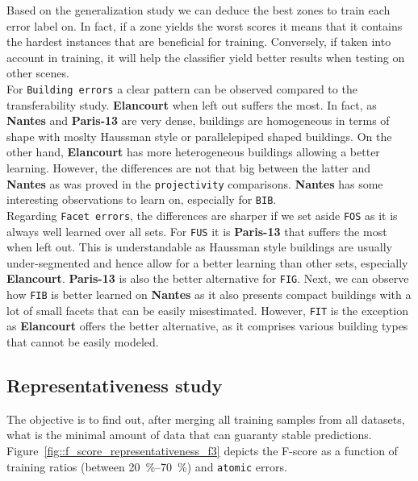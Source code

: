         Based on the generalization study we can deduce the best zones to train each error label on.
        In fact, if a zone yields the worst scores it means that it contains the hardest instances that are beneficial for training.
        Conversely, if taken into account in training, it will help the classifier yield better results when testing on other scenes.\\

        For \texttt{Building errors} a clear pattern can be observed compared to the transferability study.
        \textbf{Elancourt} when left out suffers the most.
        In fact, as \textbf{Nantes} and \textbf{Paris-13} are very dense, buildings are homogeneous in terms of shape with moslty Haussman style or parallelepiped shaped buildings.
        On the other hand, \textbf{Elancourt} has more heterogeneous buildings allowing a better learning.
        However, the differences are not that big between the latter and \textbf{Nantes} as was proved in the \texttt{projectivity} comparisons.
        \textbf{Nantes} has some interesting observations to learn on, especially for \texttt{BIB}.\\

        Regarding \texttt{Facet errors}, the differences are sharper if we set aside \texttt{FOS} as it is always well learned over all sets.
        For \texttt{FUS} it is \textbf{Paris-13} that suffers the most when left out.
        This is understandable as Haussman style buildings are usually under-segmented and hence allow for a better learning than other sets, especially \textbf{Elancourt}.
        \textbf{Paris-13} is also the better alternative for \texttt{FIG}.
        Next, we can observe how \texttt{FIB} is better learned on \textbf{Nantes} as it also presents compact buildings with a lot of small facets that can be easily misestimated.
        However, \texttt{FIT} is the exception as \textbf{Elancourt} offers the better alternative, as it comprises various building types that cannot be easily modeled.
    
    \subsection{Representativeness study}
        \label{subsec::more_experiments::scalability::representativeness}
        The objective is to find out, after merging all training samples from all datasets, what is the minimal amount of data that can guaranty stable predictions.
        Figure~\ref{fig::f_score_representativeness_f3} depicts the F-score as a function of training ratios (between \SIrange[range-phrase={ and }]{20}{70}{\percent}) and \texttt{atomic} errors.\\
                
